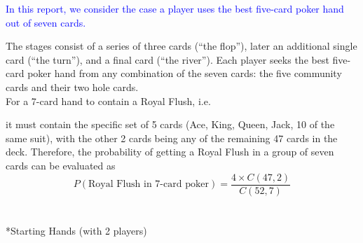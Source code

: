 \documentclass{article}
\begin{document}
\begin{center}
    \textcolor{blue}{
        In this report, we consider the case a player uses the best 
        five-card poker hand out of seven cards.
    }
\end{center}
The stages consist of a series of three cards (``the flop''), later an 
additional single card (``the turn''), and a final card (``the river''). 
Each player seeks the best five-card poker hand from any combination of 
the seven cards: the five community cards and their two hole cards.
\vspace*{5mm}\\
For a 7-card hand to contain a Royal Flush, i.e.
\begin{center}
\end{center}
it must contain the specific set of 5 cards 
(Ace, King, Queen, Jack, 10 of the same suit), 
with the other 2 cards being any of the remaining 47 cards in the deck. 
Therefore, the probability of getting a Royal Flush in a group of seven 
cards can be evaluated as 
\[
P(\text{Royal Flush in 7-card poker}) = \frac{4 \times C(47, 2)}{C(52, 7)}
\]

\newpage

\section{}*{Starting Hands (with 2 players)}
\end{document}
